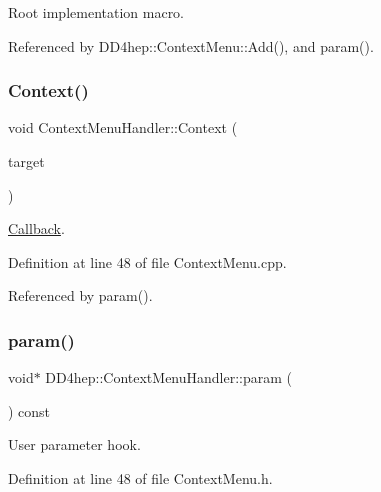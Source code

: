 Root implementation macro. 



Referenced by D\+D4hep\+::\+Context\+Menu\+::\+Add(), and param().

\hypertarget{class_d_d4hep_1_1_context_menu_handler_a1e8043084d74ec968d010d6d7452f56b}{}\label{class_d_d4hep_1_1_context_menu_handler_a1e8043084d74ec968d010d6d7452f56b} 
\subsubsection{\texorpdfstring{Context()}{Context()}}
{\footnotesize\ttfamily void Context\+Menu\+Handler\+::\+Context (\begin{DoxyParamCaption}\item[{\hyperlink{class_t_object}{T\+Object} $\ast$}]{target }\end{DoxyParamCaption})}



\hyperlink{class_d_d4hep_1_1_callback}{Callback}. 



Definition at line 48 of file Context\+Menu.\+cpp.



Referenced by param().

\hypertarget{class_d_d4hep_1_1_context_menu_handler_a1f806282dd9554fe94c5d296f95241c8}{}\label{class_d_d4hep_1_1_context_menu_handler_a1f806282dd9554fe94c5d296f95241c8} 
\subsubsection{\texorpdfstring{param()}{param()}}
{\footnotesize\ttfamily void$\ast$ D\+D4hep\+::\+Context\+Menu\+Handler\+::param (\begin{DoxyParamCaption}{ }\end{DoxyParamCaption}) const\hspace{0.3cm}{\ttfamily [inline]}}



User parameter hook. 



Definition at line 48 of file Context\+Menu.\+h.



